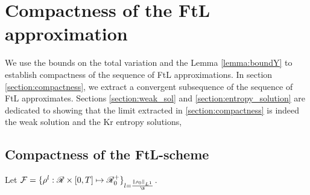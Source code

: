 \chapter{Compactness of the FtL approximation}
We use the bounds on the total variation and the Lemma \ref{lemma:boundY} to establish compactness of the sequence of FtL approximations. In section \eqref{section:compactness}, we extract a convergent subsequence of the sequence of FtL approximates. Sections \eqref{section:weak_sol} and \eqref{section:entropy_solution} are dedicated to showing that the limit extracted in \eqref{section:compactness} is indeed the weak solution and the Kr entropy solutions, 

\section{Compactness of the FtL-scheme} \label{section:compactness}
Let  $\mathcal{F} = \{\rho^l: \R\times [0,T] \mapsto \R_0^+\}_{l = \frac{\norm{\rho_0}_{L^1}}{\N}}$. 

